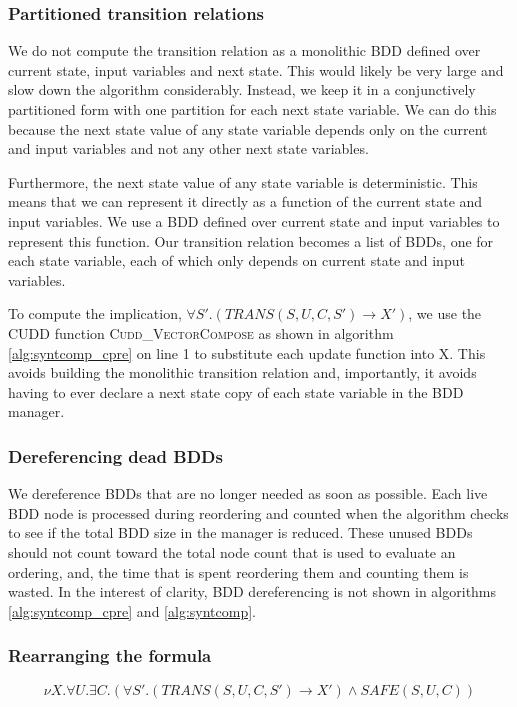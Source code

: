 \subsubsection{Partitioned transition relations}
We do not compute the transition relation as a monolithic BDD defined over current state, input variables and next state. This would likely be very large and slow down the algorithm considerably. Instead, we keep it in a conjunctively partitioned form with one partition for each next state variable. We can do this because the next state value of any state variable depends only on the current and input variables and not any other next state variables.

Furthermore, the next state value of any state variable is deterministic. This means that we can represent it directly as a function of the current state and input variables. We use a BDD defined over current state and input variables to represent this function. Our transition relation becomes a list of BDDs, one for each state variable, each of which only depends on current state and input variables. 

To compute the implication, $\forall S'. (TRANS(S, U, C, S') \rightarrow X')$, we use the CUDD function \textsc{Cudd\_VectorCompose} as shown in algorithm \ref{alg:syntcomp_cpre} on line 1 to substitute each update function into X. This avoids building the monolithic transition relation and, importantly, it avoids having to ever declare a next state copy of each state variable in the BDD manager. 

\subsubsection{Dereferencing dead BDDs}
We dereference BDDs that are no longer needed as soon as possible. Each live BDD node is processed during reordering and counted when the algorithm checks to see if the total BDD size in the manager is reduced. These unused BDDs should not count toward the total node count that is used to evaluate an ordering, and, the time that is spent reordering them and counting them is wasted. In the interest of clarity, BDD dereferencing is not shown in algorithms \ref{alg:syntcomp_cpre} and \ref{alg:syntcomp}.

\subsubsection{Rearranging the formula}
\begin{equation}
\label{eqn:mu2}
\nu X. \forall U. \exists C. (\forall S'. (TRANS(S, U, C, S') \rightarrow X') \wedge SAFE(S, U, C))
\end{equation}

